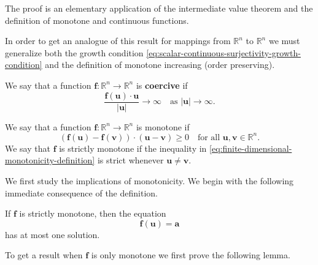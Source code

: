 The proof is an elementary application of the intermediate value theorem and the definition of monotone and continuous functions.

In order to get an analogue of this result for mappings from $\mathbb{R}^n$ to $\mathbb{R}^n$ we must generalize both the growth condition \eqref{eq:scalar-continuous-surjectivity-growth-condition} and the definition of monotone increasing (order preserving).

\begin{Definition}
\label{def:finite-dimensional-coercive-mapping}
We say that a function $\bm{f}:\mathbb{R}^n\to\mathbb{R}^n$ is \textbf{coercive} if
\begin{equation}\label{eq:finite-dimensional-nonlinear-coercivity-definition}
\dfrac{\bm{f}(\bm{u})\cdot\bm{u}}{|\bm{u}|}\to\infty\quad\text{as }|\bm{u}|\to\infty.
\end{equation}

\end{Definition}

\begin{Definition}
\label{def:finite-dimensional-monotone-mapping}
We say that a function $\bm{f}:\mathbb{R}^n\to\mathbb{R}^n$ is monotone if
\begin{equation}\label{eq:finite-dimensional-monotonicity-definition}
(\bm{f}(\bm{u})-\bm{f}(\bm{v}))\cdot(\bm{u}-\bm{v})\geq0\quad\text{for all }\bm{u},\bm{v}\in\mathbb{R}^n.
\end{equation}
We say that $\bm{f}$ is strictly monotone if the inequality in \eqref{eq:finite-dimensional-monotonicity-definition} is strict whenever $\bm{u}\neq\bm{v}$.
\end{Definition}

We first study the implications of monotonicity. We begin with the following immediate consequence of the definition.

\begin{Theorem}
\label{thm:finite-dimensional-strict-monotonicity-uniqueness}
If $\bm{f}$ is strictly monotone, then the equation
\begin{equation}\label{eq:finite-dimensional-strictly-monotone-equation}
\bm{f}(\bm{u})=\bm{a}
\end{equation}
has at most one solution.
\end{Theorem}

To get a result when $\bm{f}$ is only monotone we first prove the following lemma.

